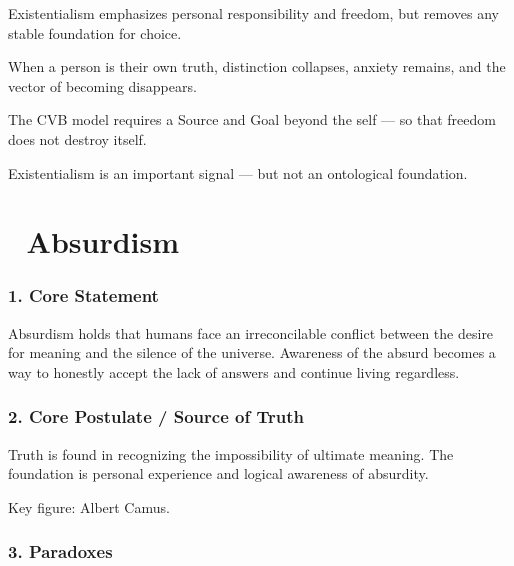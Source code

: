 \documentclass[12pt]{article}
\begin{document}
Existentialism emphasizes personal responsibility and freedom, but removes any stable foundation for choice.

When a person is their own truth, distinction collapses, anxiety remains, and the vector of becoming disappears.

The CVB model requires a Source and Goal beyond the self — so that freedom does not destroy itself.

Existentialism is an important signal — but not an ontological foundation.

\section*{🔷 Absurdism}

\subsubsection*{1. Core Statement}

Absurdism holds that humans face an irreconcilable conflict between the desire for meaning and the silence of the universe. Awareness of the absurd becomes a way to honestly accept the lack of answers and continue living regardless.

\subsubsection*{2. Core Postulate / Source of Truth}

Truth is found in recognizing the impossibility of ultimate meaning. The foundation is personal experience and logical awareness of absurdity.

Key figure: Albert Camus.

\subsubsection*{3. Paradoxes}
\end{document}
